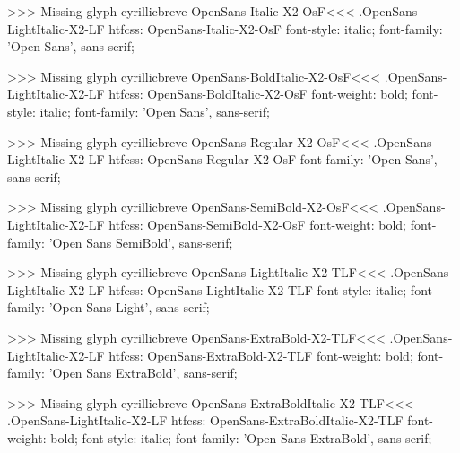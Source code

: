 >>>
Missing glyph	cyrillicbreve
\<OpenSans-Italic-X2-OsF\><<<
.OpenSans-LightItalic-X2-LF
htfcss:  OpenSans-Italic-X2-OsF  font-style: italic; font-family: 'Open Sans', sans-serif;

>>>
Missing glyph	cyrillicbreve
\<OpenSans-BoldItalic-X2-OsF\><<<
.OpenSans-LightItalic-X2-LF
htfcss:  OpenSans-BoldItalic-X2-OsF  font-weight: bold; font-style: italic; font-family: 'Open Sans', sans-serif;

>>>
Missing glyph	cyrillicbreve
\<OpenSans-Regular-X2-OsF\><<<
.OpenSans-LightItalic-X2-LF
htfcss:  OpenSans-Regular-X2-OsF  font-family: 'Open Sans', sans-serif;

>>>
Missing glyph	cyrillicbreve
\<OpenSans-SemiBold-X2-OsF\><<<
.OpenSans-LightItalic-X2-LF
htfcss:  OpenSans-SemiBold-X2-OsF  font-weight: bold; font-family: 'Open Sans SemiBold', sans-serif;

>>>
Missing glyph	cyrillicbreve
\<OpenSans-LightItalic-X2-TLF\><<<
.OpenSans-LightItalic-X2-LF
htfcss:  OpenSans-LightItalic-X2-TLF  font-style: italic; font-family: 'Open Sans Light', sans-serif;

>>>
Missing glyph	cyrillicbreve
\<OpenSans-ExtraBold-X2-TLF\><<<
.OpenSans-LightItalic-X2-LF
htfcss:  OpenSans-ExtraBold-X2-TLF  font-weight: bold; font-family: 'Open Sans ExtraBold', sans-serif;

>>>
Missing glyph	cyrillicbreve
\<OpenSans-ExtraBoldItalic-X2-TLF\><<<
.OpenSans-LightItalic-X2-LF
htfcss:  OpenSans-ExtraBoldItalic-X2-TLF  font-weight: bold; font-style: italic; font-family: 'Open Sans ExtraBold', sans-serif;

